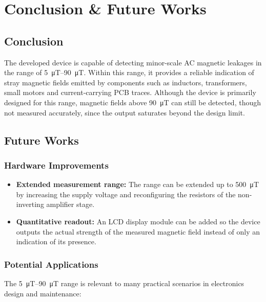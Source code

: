\documentclass[11pt,a4paper]{article}
\begin{document}
\section{Conclusion \& Future Works}
\label{sec:conclusion}

\subsection{Conclusion}

The developed device is capable of detecting minor-scale AC magnetic leakages in the range of \SIrange{5}{90}{\micro\tesla}. Within this range, it provides a reliable indication of stray magnetic fields emitted by components such as inductors, transformers, small motors and current-carrying PCB traces. Although the device is primarily designed for this range, magnetic fields above \SI{90}{\micro\tesla} can still be detected, though not measured accurately, since the output saturates beyond the design limit.

\subsection{Future Works}

\subsubsection{Hardware Improvements}

\begin{itemize}
  \item \textbf{Extended measurement range:} The range can be extended up to \SI{500}{\micro\tesla} by increasing the supply voltage and reconfiguring the resistors of the non-inverting amplifier stage.
  \item \textbf{Quantitative readout:} An LCD display module can be added so the device outputs the actual strength of the measured magnetic field instead of only an indication of its presence.
\end{itemize}

\subsubsection{Potential Applications}

The \SIrange{5}{90}{\micro\tesla} range is relevant to many practical scenarios in electronics design and maintenance:
\end{document}
